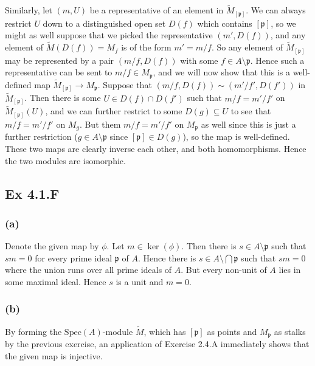 \documentclass{article}
\theoremstyle{definition}
\newcommand{\Spec}{\text{Spec}}
\begin{document}
Similarly, let $(m, U)$ be a representative of an element in
$\widetilde{M}_{[\mathfrak{p}]}$. We can always restrict $U$ down to a
distinguished open set $D(f)$ which contains $[\mathfrak{p}]$, so we might as
well suppose that we picked the representative $(m', D(f))$, and any element of
$\widetilde{M}(D(f)) = M_f$ is of the form $m' = m/f$. So any element of
$\widetilde{M}_{[\mathfrak{p}]}$ may be represented by a pair $(m/f, D(f))$
with some $f \in A \setminus \mathfrak{p}$. Hence such a representative can be
sent to $m/f \in M_{\mathfrak{p}}$, and we will now show that this is a
well-defined map $\widetilde{M}_{[\mathfrak{p}]} \to M_{\mathfrak{p}}$. Suppose
that $(m/f, D(f)) \sim (m'/f', D(f'))$ in $\widetilde{M}_{[\mathfrak{p}]}$.
Then there is some $U \in D(f) \cap D(f')$ such that $m/f = m'/f'$ on
$\widetilde{M}_{[\mathfrak{p}]}(U)$, and we can further restrict to some $D(g)
\subseteq U$ to see that $m/f = m'/f'$ on $M_g$. But them $m/f = m'/f'$ on
$M_{\mathfrak{p}}$ as well since this is just a further restriction ($g \in A
\setminus \mathfrak{p}$ since $[\mathfrak{p}] \in D(g)$), so the map is
well-defined. \\

These two maps are clearly inverse each other, and both homomorphisms. Hence
the two modules are isomorphic.

\subsection*{Ex 4.1.F}

\subsubsection*{(a)}

Denote the given map by $\phi$. Let $m \in \ker(\phi)$. Then there is $s \in A
\setminus \mathfrak{p}$ such that $sm = 0$ for every prime ideal $\mathfrak{p}$
of $A$. Hence there is $s \in A \setminus \bigcap \mathfrak{p}$ such that $sm =
0$ where the union runs over all prime ideals of $A$. But every non-unit of $A$
lies in some maximal ideal. Hence $s$ is a unit and $m = 0$.

\subsubsection*{(b)}

By forming the $\Spec(A)$-module $\widetilde{M}$, which has $[\mathfrak{p}]$ as
points and $M_{\mathfrak{p}}$ as stalks by the previous exercise, an
application of Exercise 2.4.A immediately shows that the given map is
injective.
\end{document}
